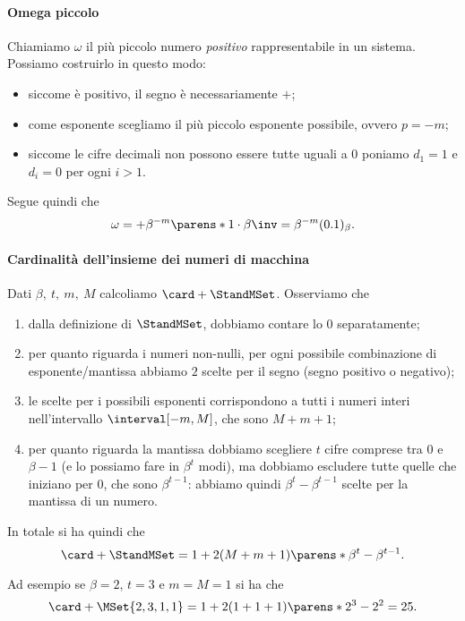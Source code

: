 \paragraph{Omega piccolo} Chiamiamo $\omega$ il più piccolo numero \emph{positivo} rappresentabile in un sistema. Possiamo costruirlo in questo modo: \begin{itemize}
    \item siccome è positivo, il segno è necessariamente $+$;
    \item come esponente scegliamo il più piccolo esponente possibile, ovvero $p = -m$;
    \item siccome le cifre decimali non possono essere tutte uguali a $0$ poniamo $d_1 = 1$ e $d_i = 0$ per ogni $i > 1$.   
\end{itemize} Segue quindi che \[
    \omega = +\beta^{-m} \parens*{1 \cdot \beta\inv} = \beta^{-m}(0.1)_\beta.
\]

\paragraph{Cardinalità dell'insieme dei numeri di macchina} Dati $\beta,\ t,\ m,\ M$ calcoliamo $\card+{\StandMSet}$. Osserviamo che \begin{enumerate}
    \item dalla definizione di $\StandMSet$, dobbiamo contare lo $0$ separatamente;
    \item per quanto riguarda i numeri non-nulli, per ogni possibile combinazione di esponente/mantissa abbiamo $2$ scelte per il segno (segno positivo o negativo);
    \item le scelte per i possibili esponenti corrispondono a tutti i numeri interi nell'intervallo $\interval[{-m, M}]$, che sono $M + m + 1$;
    \item per quanto riguarda la mantissa dobbiamo scegliere $t$ cifre comprese tra $0$ e $\beta - 1$ (e lo possiamo fare in $\beta^t$ modi), ma dobbiamo escludere tutte quelle che iniziano per $0$, che sono $\beta^{t-1}$: abbiamo quindi $\beta^t - \beta^{t-1}$ scelte per la mantissa di un numero.
\end{enumerate} 
In totale si ha quindi che \[
    \card+{\StandMSet} = 1 + 2(M + m + 1)\parens*{\beta^t - \beta^{t-1}}.
\]

\begin{example}
    Ad esempio se $\beta = 2$, $t = 3$ e $m = M = 1$ si ha che \[
        \card+{\MSet{2, 3, 1, 1}} = 1 + 2(1 + 1 + 1)\parens*{2^3 - 2^2} = 25.
    \]
\end{example}

